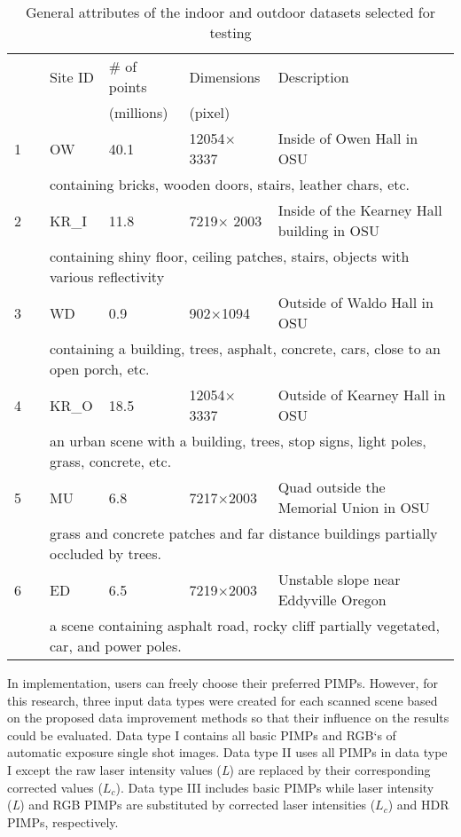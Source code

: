 \documentclass[final,3p,times,twocolumn,authoryear]{elsarticle}
\begin{document}
\begin{table*}[h]
	\centering
	\caption{General attributes of the indoor and outdoor datasets selected for testing}
	\label{my-label}
	\begin{tabular}{lcllll}
		&                          & Site ID & \# of points & Dimensions & Description  \\
		& &  &  (millions)&  (pixel) &    \\
		\hline 
		1 & \multirow{4}{*}{\rotatebox[origin=c]{90}{Indoor}}  & OW& 40.1 & 12054$\times$3337 & Inside of Owen Hall in OSU\\
		& & \multicolumn{4}{l}{containing bricks, wooden doors, stairs, leather chars, etc.}\\
		2 & & KR\_I  & 11.8 & 7219$\times$ 2003& Inside of the Kearney Hall building in OSU\\
		& & \multicolumn{4}{l}{containing shiny floor, ceiling patches, stairs,  objects with various reflectivity}\\
		\hline
		3 & \multirow{8}{*}{\rotatebox[origin=]{90}{Outdoor}} & WD& 0.9  & 902$\times$1094   & Outside of Waldo Hall in OSU\\
		& & \multicolumn{4}{l}{containing a building, trees, asphalt, concrete, cars, close to an open porch, etc.} \\
		4 & & KR\_O         & 18.5 & 12054$\times$3337   & Outside of Kearney Hall in OSU\\
		& & \multicolumn{4}{l}{an urban scene with a building, trees, stop signs, light poles, grass, concrete, etc. }\\
		5 &   & MU   & 6.8   & 7217$\times$2003 & Quad outside the Memorial Union in OSU\\
		& & \multicolumn{4}{l}{grass and concrete patches and far distance buildings partially occluded by trees.}\\
		6 &   & ED    & 6.5  & 7219$\times$2003   & Unstable slope near Eddyville Oregon\\
		& & \multicolumn{4}{l}{a scene containing asphalt road, rocky cliff partially vegetated, car, and power poles.}\\
		\hline
	\end{tabular}
\end{table*}


In implementation, users can freely choose their preferred PIMPs. However, for this research, three input data types were created for each scanned scene based on the proposed data improvement methods so that their influence on the results could be evaluated. Data type I contains all basic PIMPs and RGB‘s of automatic exposure single shot images. Data type II uses all PIMPs in data type I except the raw laser intensity values (\textit{L}) are replaced by their corresponding corrected values ($L_c$). Data type III includes basic PIMPs while laser intensity (\textit{L}) and RGB PIMPs are substituted by corrected laser intensities ($L_c$) and HDR PIMPs, respectively.
\end{document}
